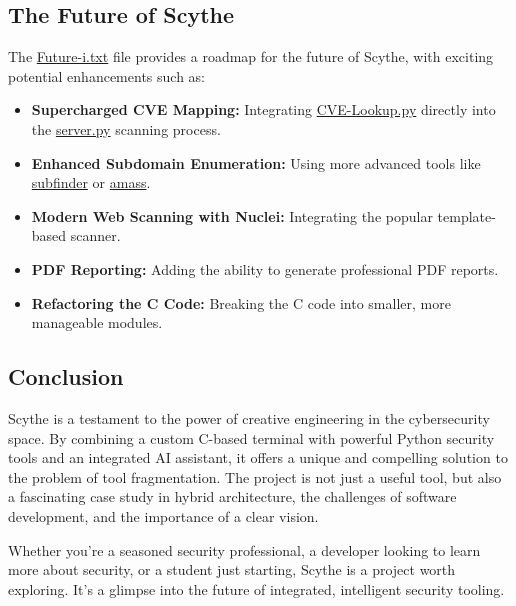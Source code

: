 \documentclass{article}
\begin{document}
\subsection{The Future of Scythe}\label{the-future-of-scythe}

The \url{Future-i.txt} file provides a roadmap for the future of
Scythe, with exciting potential enhancements such as:

\begin{itemize}
\item
  \textbf{Supercharged CVE Mapping:} Integrating \url{CVE-Lookup.py}
  directly into the \url{server.py} scanning process.
\item
  \textbf{Enhanced Subdomain Enumeration:} Using more advanced tools
  like \url{subfinder} or \url{amass}.
\item
  \textbf{Modern Web Scanning with Nuclei:} Integrating the popular
  template-based scanner.
\item
  \textbf{PDF Reporting:} Adding the ability to generate professional
  PDF reports.
\item
  \textbf{Refactoring the C Code:} Breaking the C code into smaller,
  more manageable modules.
\end{itemize}

\subsection{Conclusion}\label{conclusion}

Scythe is a testament to the power of creative engineering in the
cybersecurity space. By combining a custom C-based terminal with
powerful Python security tools and an integrated AI assistant, it offers
a unique and compelling solution to the problem of tool fragmentation.
The project is not just a useful tool, but also a fascinating case study
in hybrid architecture, the challenges of software development, and the
importance of a clear vision.

Whether you're a seasoned security professional, a developer looking to
learn more about security, or a student just starting, Scythe is a
project worth exploring. It's a glimpse into the future of integrated,
intelligent security tooling.
\end{document}

